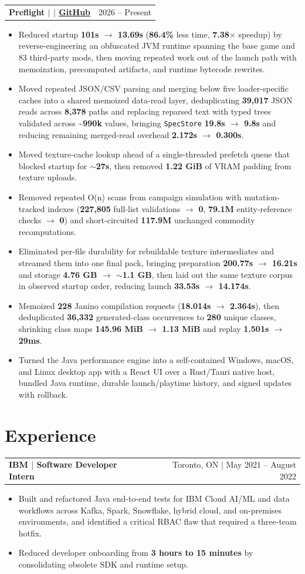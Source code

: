 \documentclass[letterpaper,11pt]{article}
\makeatletter
\newcommand{\resumeHeadingSimple}[2]{%
  \begin{tabularx}{\textwidth}{@{}Xr@{}}
    \textbf{#1} & #2
  \end{tabularx}\vspace{-1pt}
}
\newcommand{\resumeItemListStart}{\begin{itemize}[leftmargin=0.23in,itemsep=0.4pt,parsep=0pt,topsep=0.5pt]}
\newcommand{\resumeItem}[1]{\item\fontsize{10.2pt}{11.5pt}\selectfont #1}
\newcommand{\resumeItemListEnd}{\end{itemize}\vspace{-1.25pt}}
\makeatother
\begin{document}
\resumeHeadingSimple
  {Preflight $|$ \normalfont{Cross-platform performance launcher \& mod analysis toolkit} $|$ \href{https://github.com/teamleaderleo/preflight}{GitHub}}
  {2026 -- Present}
\resumeItemListStart
  \resumeItem{Reduced startup \textbf{101s $\rightarrow$ 13.69s} (\textbf{86.4\%} less time, \textbf{7.38$\times$} speedup) by reverse-engineering an obfuscated JVM runtime spanning the base game and 83 third-party mods, then moving repeated work out of the launch path with memoization, precomputed artifacts, and runtime bytecode rewrites.}
  \resumeItem{Moved repeated JSON/CSV parsing and merging below five loader-specific caches into a shared memoized data-read layer, deduplicating \textbf{39,017} JSON reads across \textbf{8,378} paths and replacing reparsed text with typed trees validated across \textbf{\textasciitilde990k} values, bringing \texttt{SpecStore} \textbf{19.8s $\rightarrow$ 9.8s} and reducing remaining merged-read overhead \textbf{2.172s $\rightarrow$ 0.300s}.}
  \resumeItem{Moved texture-cache lookup ahead of a single-threaded prefetch queue that blocked startup for \textbf{$\sim$27s}, then removed \textbf{1.22 GiB} of VRAM padding from texture uploads.}
  \resumeItem{Removed repeated O(n) scans from campaign simulation with mutation-tracked indexes (\textbf{227,805} full-list validations $\rightarrow$ \textbf{0}, \textbf{79.1M} entity-reference checks $\rightarrow$ \textbf{0}) and short-circuited \textbf{117.9M} unchanged commodity recomputations.}
  \resumeItem{Eliminated per-file durability for rebuildable texture intermediates and streamed them into one final pack, bringing preparation \textbf{200.77s $\rightarrow$ 16.21s} and storage \textbf{4.76 GB $\rightarrow$ $\sim$1.1 GB}, then laid out the same texture corpus in observed startup order, reducing launch \textbf{33.53s $\rightarrow$ 14.174s}.}
  \resumeItem{Memoized \textbf{228} Janino compilation requests (\textbf{18.014s $\rightarrow$ 2.364s}), then deduplicated \textbf{36,332} generated-class occurrences to \textbf{280} unique classes, shrinking class maps \textbf{145.96 MiB $\rightarrow$ 1.13 MiB} and replay \textbf{1.501s $\rightarrow$ 29ms}.}
  \resumeItem{Turned the Java performance engine into a self-contained Windows, macOS, and Linux desktop app with a React UI over a Rust/Tauri native host, bundled Java runtime, durable launch/playtime history, and signed updates with rollback.}
\resumeItemListEnd

\section{Experience}
\resumeHeadingSimple
  {IBM $|$ Software Developer Intern}
  {Toronto, ON $|$ May 2021 -- August 2022}
\resumeItemListStart
  \resumeItem{Built and refactored Java end-to-end tests for IBM Cloud AI/ML and data workflows across Kafka, Spark, Snowflake, hybrid cloud, and on-premises environments, and identified a critical RBAC flaw that required a three-team hotfix.}
  \resumeItem{Reduced developer onboarding from \textbf{3 hours to 15 minutes} by consolidating obsolete SDK and runtime setup.}
\resumeItemListEnd
\end{document}
